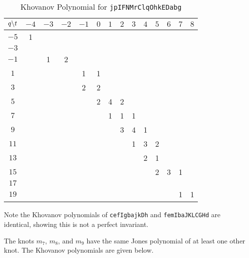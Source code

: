 \documentclass{article}
\theoremstyle{plain}
\begin{document}
        \begin{table}[H]
            \centering
            \begin{tabular}{| c | c | c | c | c | c | c | c | c | c | c | c | c | c |}
                \hline
                $q\symbol{92}t$&$-4$&$-3$&$-2$&$-1$&$0$&$1$&$2$&$3$&$4$&$5$&$6$&$7$&$8$\\
                \hline
                $-5$&1&&&&&&&&&&&&\\
                \hline
                $-3$&&&&&&&&&&&&&\\
                \hline
                $-1$&&1&2&&&&&&&&&&\\
                \hline
                $1$&&&&1&1&&&&&&&&\\
                \hline
                $3$&&&&2&2&&&&&&&&\\
                \hline
                $5$&&&&&2&4&2&&&&&&\\
                \hline
                $7$&&&&&&1&1&1&&&&&\\
                \hline
                $9$&&&&&&&3&4&1&&&&\\
                \hline
                $11$&&&&&&&&1&3&2&&&\\
                \hline
                $13$&&&&&&&&&2&1&&&\\
                \hline
                $15$&&&&&&&&&&2&3&1&\\
                \hline
                $17$&&&&&&&&&&&&&\\
                \hline
                $19$&&&&&&&&&&&&1&1\\
                \hline
            \end{tabular}
            \caption{Khovanov Polynomial for \texttt{jpIFNMrClqOhkEDabg}}
            \label{table:jpIFNMrClqOhkEDabg_kho}
        \end{table}
        Note the Khovanov polynomials of \texttt{cefIgbajkDh} and
        \texttt{femIbaJKLCGHd} are identical, showing this is not a perfect
        invariant.
        \par\hfill\par
        The knots $m_{7}$, $m_{8}$, and $m_{9}$ have the same Jones polynomial
        of at least one other knot. The Khovanov polynomials are given below.
\end{document}
